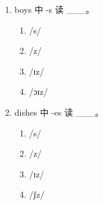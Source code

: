 \documentclass[11pt,a4paper]{ctexart}
\begin{document}
\begin{enumerate}[leftmargin=*,itemsep=4pt]
\begin{enumerate}[label=\Alph*.,leftmargin=2em,itemsep=1pt,topsep=2pt]
\item /s/
\item /z/
\item /ɪz/
\item /tʃɪz/
\end{enumerate}
\item boys 中 -s 读 \_\_\_。
\begin{enumerate}[label=\Alph*.,leftmargin=2em,itemsep=1pt,topsep=2pt]
\item /s/
\item /z/
\item /ɪz/
\item /ɔɪz/
\end{enumerate}
\item dishes 中 -es 读 \_\_\_。
\begin{enumerate}[label=\Alph*.,leftmargin=2em,itemsep=1pt,topsep=2pt]
\item /s/
\item /z/
\item /ɪz/
\item /ʃz/
\end{enumerate}
\end{enumerate}
\end{document}

